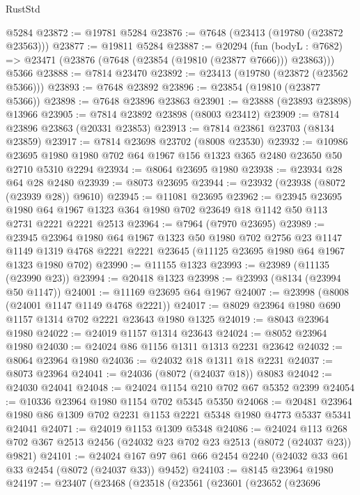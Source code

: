 \begin{lexlean}{RustStd}
\begin{coremodule}
    @5284
@23872 := @19781 @5284
@23876 := @7648 (@23413 (@19780 (@23872 @23563)))
@23877 := @19811 @5284
@23887 := @20294
    (fun (bodyL : @7682) => @23471 (@23876 (@7648 (@23854 (@19810 (@23877 @7666))) @23863)))
    @5366
@23888 := @7814 @23470
@23892 := @23413 (@19780 (@23872 (@23562 @5366)))
@23893 := @7648 @23892
@23896 := @23854 (@19810 (@23877 @5366))
@23898 := @7648 @23896 @23863
@23901 := @23888 (@23893 @23898) @13966
@23905 := @7814 @23892 @23898 (@8003 @23412)
@23909 := @7814 @23896 @23863 (@20331 @23853)
@23913 := @7814 @23861 @23703 (@8134 @23859)
@23917 := @7814 @23698 @23702 (@8008 @23530)
@23932 := @10986
    @23695
    @1980
    @1980
    @702
    @64
    @1967
    @156
    @1323
    @365
    @2480
    @23650
    @50
    @2710
    @5310
    @2294
@23934 := @8064 @23695 @1980
@23938 := @23934 @28 @64 @28 @2480
@23939 := @8073 @23695
@23944 := @23932 (@23938 (@8072 (@23939 @28)) @9610)
@23945 := @11081 @23695
@23962 := @23945
    @23695
    @1980
    @64
    @1967
    @1323
    @364
    @1980
    @702
    @23649
    @18
    @1142
    @50
    @113
    @2731
    @2221
    @2221
    @2513
@23964 := @7964 (@7970 @23695)
@23989 := @23945
    @23964
    @1980
    @64
    @1967
    @1323
    @50
    @1980
    @702
    @2756
    @23
    @1147
    @1149
    @1319
    @4768
    @2221
    @2221
    @23645
    (@11125 @23695 @1980 @64 @1967 @1323 @1980 @702)
@23990 := @11155 @1323
@23993 := @23989 (@11135 (@23990 @23))
@23994 := @20418 @1323
@23998 := @23993 (@8134 (@23994 @50 @1147))
@24001 := @11169 @23695 @64 @1967
@24007 := @23998 (@8008 (@24001 @1147 @1149 @4768 @2221))
@24017 := @8029 @23964 @1980 @690 @1157 @1314 @702 @2221 @23643 @1980 @1325
@24019 := @8043 @23964 @1980
@24022 := @24019 @1157 @1314 @23643
@24024 := @8052 @23964 @1980
@24030 := @24024 @86 @1156 @1311 @1313 @2231 @23642
@24032 := @8064 @23964 @1980
@24036 := @24032 @18 @1311 @18 @2231
@24037 := @8073 @23964
@24041 := @24036 (@8072 (@24037 @18)) @8083
@24042 := @24030 @24041
@24048 := @24024 @1154 @210 @702 @67 @5352 @2399
@24054 := @10336 @23964 @1980 @1154 @702 @5345 @5350
@24068 := @20481 @23964 @1980 @86 @1309 @702 @2231 @1153 @2221 @5348 @1980 @4773 @5337 @5341 @24041
@24071 := @24019 @1153 @1309 @5348
@24086 := @24024
    @113
    @268
    @702
    @367
    @2513
    @2456
    (@24032 @23 @702 @23 @2513 (@8072 (@24037 @23)) @9821)
@24101 := @24024 @167 @97 @61 @66 @2454 @2240 (@24032 @33 @61 @33 @2454 (@8072 (@24037 @33)) @9452)
@24103 := @8145 @23964 @1980
@24197 := @23407
    (@23468
      (@23518
        (@23561
          (@23601
            (@23652
              (@23696

\end{coremodule}
\end{lexlean}
